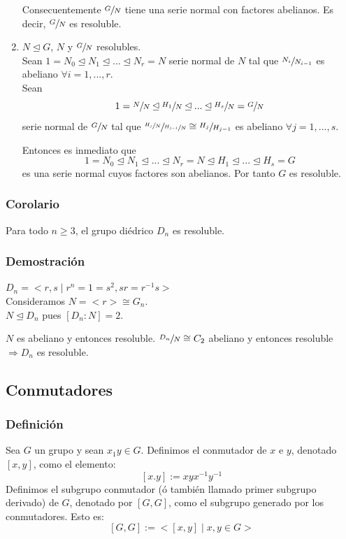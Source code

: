 \documentclass[11pt,a4paper]{article}
\begin{document}
\begin{enumerate}[label = \arabic*)]
Consecuentemente $\sfrac{G}{N}$ tiene una serie normal con factores abelianos. Es decir, $\sfrac{G}{N}$ es resoluble.
\item $N \unlhd G$, $N$ y $\sfrac{G}{N}$ resolubles. \\
Sean $1 = N_{0} \unlhd N_{1} \unlhd ... \unlhd N_{r} = N$ serie normal de $N$ tal que $\sfrac{N_{i}}{N_{i-1}}$ es abeliano $\forall i = 1, ..., r$. \\
Sean
$$1 = \sfrac{N}{N} \unlhd \sfrac{H_{1}}{N} \unlhd ... \unlhd \sfrac{H_{s}}{N} = \sfrac{G}{N}$$
serie normal de $\sfrac{G}{N}$ tal que $\sfrac{\sfrac{H_{j}}{N}}{\sfrac{H_{j-1}}{N}} \cong \sfrac{H_{j}}{H_{j-1}}$ es abeliano $\forall j = 1, ..., s$.

Entonces es inmediato que
$$1 = N_{0} \unlhd N_{1} \unlhd ... \unlhd N_{r} = N \unlhd H_{1} \unlhd ... \unlhd H_{s} = G$$
es una serie normal cuyos factores son abelianos. Por tanto $G$ es resoluble.
\end{enumerate}

\subsubsection*{Corolario}

Para todo $n \geq 3$, el grupo diédrico $D_{n}$ es resoluble.

\subsubsection*{Demostración}

$D_{n} = <r,s \mid r^{n} = 1 = s^{2}, sr = r^{-1}s>$ \\
Consideramos $N = <r> \cong G_{n}$. \\
$N \unlhd D_{n}$ pues $[D_{n} : N] = 2$.

$N$ es abeliano y entonces resoluble. $\sfrac{D_{n}}{N} \cong C_{2}$ abeliano y entonces resoluble $\Rightarrow D_{n}$ es resoluble.

\subsection{Conmutadores}

\subsubsection*{Definición}

Sea $G$ un grupo y sean $x_{1}y \in G$. Definimos el conmutador de $x$ e $y$, denotado $[x,y]$, como el elemento:
$$[x.y] := xyx^{-1}y^{-1}$$
Definimos el subgrupo conmutador (ó también llamado primer subgrupo derivado) de $G$, denotado por $[G, G]$, como el subgrupo generado por los conmutadores. Esto es:
$$[G, G] := <[x,y] \mid x,y \in G>$$
\end{document}

